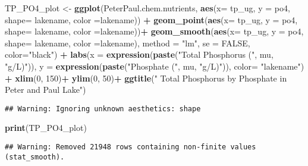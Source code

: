 \documentclass[]{article}
\newenvironment{Shaded}{\begin{snugshade}}{\end{snugshade}}
\newcommand{\DataTypeTok}[1]{\textcolor[rgb]{0.13,0.29,0.53}{#1}}
\newcommand{\DecValTok}[1]{\textcolor[rgb]{0.00,0.00,0.81}{#1}}
\newcommand{\KeywordTok}[1]{\textcolor[rgb]{0.13,0.29,0.53}{\textbf{#1}}}
\newcommand{\NormalTok}[1]{#1}
\newcommand{\OperatorTok}[1]{\textcolor[rgb]{0.81,0.36,0.00}{\textbf{#1}}}
\newcommand{\OtherTok}[1]{\textcolor[rgb]{0.56,0.35,0.01}{#1}}
\newcommand{\StringTok}[1]{\textcolor[rgb]{0.31,0.60,0.02}{#1}}
\begin{document}
\begin{Shaded}
\begin{Highlighting}[]
\NormalTok{TP_PO4_plot <-}\StringTok{ }\KeywordTok{ggplot}\NormalTok{(PeterPaul.chem.nutrients, }\KeywordTok{aes}\NormalTok{(}\DataTypeTok{x=}\NormalTok{ tp_ug, }\DataTypeTok{y =}\NormalTok{ po4, }\DataTypeTok{shape=}\NormalTok{ lakename, }\DataTypeTok{color =}\NormalTok{lakename)) }\OperatorTok{+}\StringTok{ }
\StringTok{  }\KeywordTok{geom_point}\NormalTok{(}\KeywordTok{aes}\NormalTok{(}\DataTypeTok{x=}\NormalTok{ tp_ug, }\DataTypeTok{y =}\NormalTok{ po4, }\DataTypeTok{shape=}\NormalTok{ lakename, }\DataTypeTok{color =}\NormalTok{lakename))}\OperatorTok{+}
\StringTok{  }\KeywordTok{geom_smooth}\NormalTok{(}\KeywordTok{aes}\NormalTok{(}\DataTypeTok{x=}\NormalTok{ tp_ug, }\DataTypeTok{y =}\NormalTok{ po4, }\DataTypeTok{shape=}\NormalTok{ lakename, }\DataTypeTok{color =}\NormalTok{lakename), }\DataTypeTok{method =} \StringTok{"lm"}\NormalTok{, }\DataTypeTok{se =} \OtherTok{FALSE}\NormalTok{, }\DataTypeTok{color=}\StringTok{"black"}\NormalTok{) }\OperatorTok{+}
\StringTok{  }\KeywordTok{labs}\NormalTok{(}\DataTypeTok{x =} \KeywordTok{expression}\NormalTok{(}\KeywordTok{paste}\NormalTok{(}\StringTok{"Total Phosphorus ("}\NormalTok{, mu, }\StringTok{"g/L)"}\NormalTok{)), }\DataTypeTok{y =} \KeywordTok{expression}\NormalTok{(}\KeywordTok{paste}\NormalTok{(}\StringTok{"Phosphate ("}\NormalTok{, mu, }\StringTok{"g/L)"}\NormalTok{)), }\DataTypeTok{color=} \StringTok{"lakename"}\NormalTok{) }\OperatorTok{+}
\StringTok{  }\KeywordTok{xlim}\NormalTok{(}\DecValTok{0}\NormalTok{, }\DecValTok{150}\NormalTok{)}\OperatorTok{+}
\StringTok{  }\KeywordTok{ylim}\NormalTok{(}\DecValTok{0}\NormalTok{, }\DecValTok{50}\NormalTok{)}\OperatorTok{+}
\StringTok{  }\KeywordTok{ggtitle}\NormalTok{(}\StringTok{" Total Phosphorus by Phosphate in Peter and Paul Lake"}\NormalTok{)}
\end{Highlighting}
\end{Shaded}

\begin{verbatim}
## Warning: Ignoring unknown aesthetics: shape
\end{verbatim}

\begin{Shaded}
\begin{Highlighting}[]
\KeywordTok{print}\NormalTok{(TP_PO4_plot)}
\end{Highlighting}
\end{Shaded}

\begin{verbatim}
## Warning: Removed 21948 rows containing non-finite values (stat_smooth).
\end{verbatim}
\end{document}
